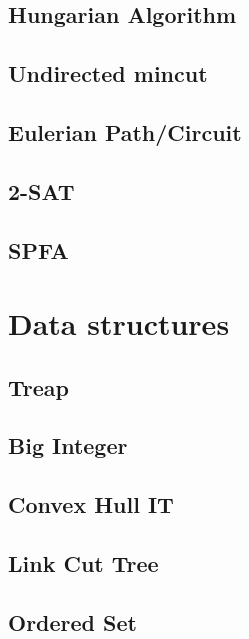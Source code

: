 \subsection{Hungarian Algorithm}
\raggedbottom
\hrulefill
\subsection{Undirected mincut}
\raggedbottom
\hrulefill
\subsection{Eulerian Path/Circuit}
\raggedbottom
\hrulefill
\subsection{2-SAT}
\raggedbottom
\hrulefill
\subsection{SPFA}
\raggedbottom
\hrulefill

\section{Data structures}
\subsection{Treap}
\raggedbottom
\hrulefill
\subsection{Big Integer}
\raggedbottom
\hrulefill
\subsection{Convex Hull IT}
\raggedbottom
\hrulefill
\subsection{Link Cut Tree}
\raggedbottom
\hrulefill
\subsection{Ordered Set}
\raggedbottom
\hrulefill
